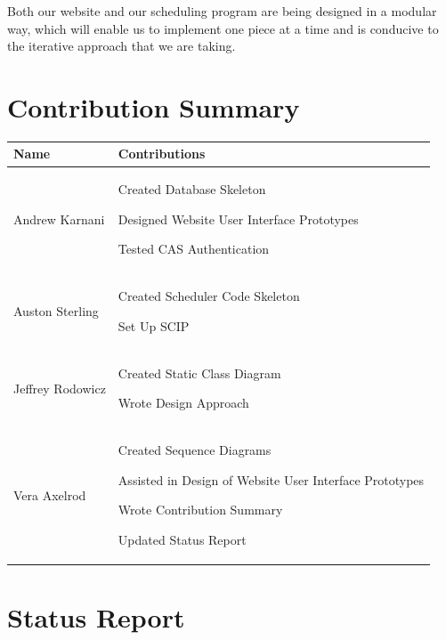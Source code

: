 \documentclass[11pt]{article}
\newenvironment{packed_itemize}{
\begin{itemize}
  \setlength{\itemsep}{1pt}
  \setlength{\parskip}{0pt}
  \setlength{\parsep}{0pt}
}{\end{itemize}}
\begin{document}
Both our website and our scheduling program are being designed in a modular way, which will enable us to implement one piece at a time and is conducive to the iterative approach that we are taking.


\section{Contribution Summary} %
\begin{tabular}{|m{1.4in}|m{4.4in}|}
\hline 
\textbf{\large Name}     & \textbf{\large Contributions} \\
\hline\hline

 Andrew Karnani
	&
	 \begin{packed_itemize}
		\item Created Database Skeleton
		\item Designed Website User Interface Prototypes
		\item Tested CAS Authentication
	\end{packed_itemize}
\\
\hline
 Auston Sterling
	&
	 \begin{packed_itemize}
	        \item Created Scheduler Code Skeleton
		  \item Set Up SCIP
	\end{packed_itemize}
\\
\hline
Jeffrey Rodowicz
	&
	 \begin{packed_itemize}
		\item Created Static Class Diagram
		\item Wrote Design Approach
	\end{packed_itemize}
\\
\hline
Vera Axelrod
	&
	 \begin{packed_itemize}
		\item Created Sequence Diagrams
		\item Assisted in Design of Website User Interface Prototypes
		\item Wrote Contribution Summary
		\item Updated Status Report
	\end{packed_itemize}
\\
\hline
\end{tabular}

\section{Status Report} %
\end{document}
